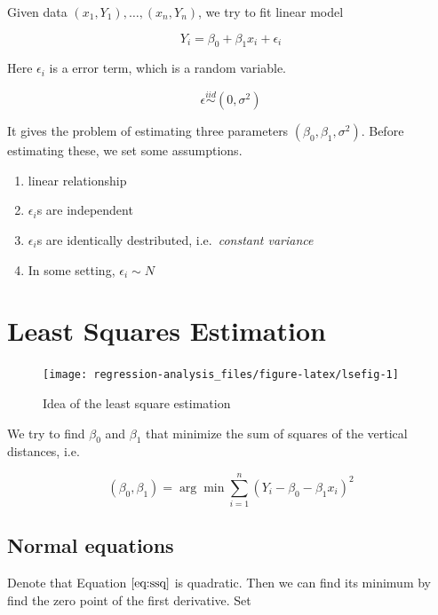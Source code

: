 \documentclass[]{book}
\providecommand{\tightlist}{%
  \setlength{\itemsep}{0pt}\setlength{\parskip}{0pt}}
\theoremstyle{definition}
\theoremstyle{definition}
\theoremstyle{definition}
\theoremstyle{remark}
\begin{document}
Given data \((x_1, Y_1), \ldots, (x_n, Y_n)\), we try to fit linear model

\[Y_i = \beta_0 + \beta_1 x_i + \epsilon_i\]

Here \(\epsilon_i\) is a error term, which is a random variable.

\[\epsilon \stackrel{iid}{\sim} (0, \sigma^2)\]

It gives the problem of estimating three parameters \((\beta_0, \beta_1, \sigma^2)\). Before estimating these, we set some assumptions.

\begin{enumerate}
\def\labelenumi{\arabic{enumi}.}
\tightlist
\item
  linear relationship
\item
  \(\epsilon_i\)s are independent
\item
  \(\epsilon_i\)s are identically destributed, i.e.~\emph{constant variance}
\item
  In some setting, \(\epsilon_i \sim N\)
\end{enumerate}

\hypertarget{least-squares-estimation}{%
\section{Least Squares Estimation}\label{least-squares-estimation}}

\begin{figure}[H]

{\centering \texttt{[image: regression-analysis\_files/figure-latex/lsefig-1]} 

}

\caption{Idea of the least square estimation\label{fig:lsefig}}\label{fig:lsefig}
\end{figure}

We try to find \(\beta_0\) and \(\beta_1\) that minimize the sum of squares of the vertical distances, i.e.

\begin{equation} \label{eq:ssq}
  (\beta_0, \beta_1) = \arg\min \sum_{i = 1}^n (Y_i - \beta_0 - \beta_1 x_i)^2
\end{equation}

\hypertarget{normal-equations}{%
\subsection{Normal equations}\label{normal-equations}}

Denote that Equation \(\eqref{eq:ssq}\) is quadratic. Then we can find its minimum by find the zero point of the first derivative. Set
\end{document}
